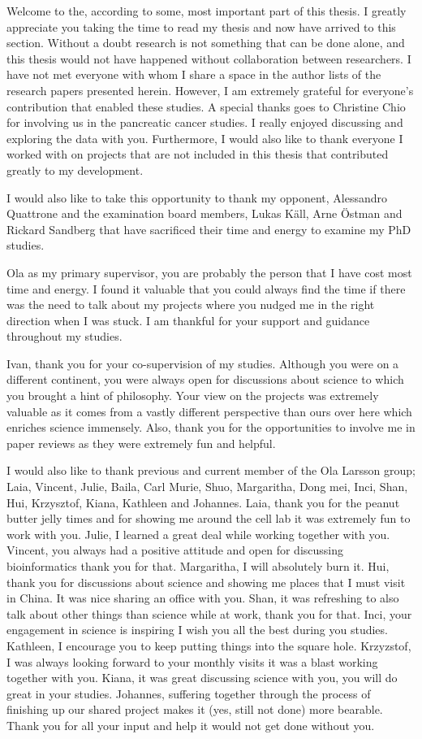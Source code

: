 \documentclass[12pt,openany]{book}
\begin{document}
Welcome to the, according to some, most important part of this thesis. I
greatly appreciate you taking the time to read my thesis and now have
arrived to this section. Without a doubt research is not something that
can be done alone, and this thesis would not have happened without
collaboration between researchers. I have not met everyone with whom I
share a space in the author lists of the research papers presented
herein. However, I am extremely grateful for everyone's contribution
that enabled these studies. A special thanks goes to Christine Chio for
involving us in the pancreatic cancer studies. I really enjoyed
discussing and exploring the data with you. Furthermore, I would also
like to thank everyone I worked with on projects that are not included
in this thesis that contributed greatly to my development.

I would also like to take this opportunity to thank my opponent,
Alessandro Quattrone and the examination board members, Lukas Käll, Arne
Östman and Rickard Sandberg that have sacrificed their time and energy
to examine my PhD studies.

Ola as my primary supervisor, you are probably the person that I have
cost most time and energy. I found it valuable that you could always
find the time if there was the need to talk about my projects where you
nudged me in the right direction when I was stuck. I am thankful for
your support and guidance throughout my studies.

Ivan, thank you for your co-supervision of my studies. Although you were
on a different continent, you were always open for discussions about
science to which you brought a hint of philosophy. Your view on the
projects was extremely valuable as it comes from a vastly different
perspective than ours over here which enriches science immensely. Also,
thank you for the opportunities to involve me in paper reviews as they
were extremely fun and helpful.

I would also like to thank previous and current member of the Ola
Larsson group; Laia, Vincent, Julie, Baila, Carl Murie, Shuo,
Margaritha, Dong mei, Inci, Shan, Hui, Krzysztof, Kiana, Kathleen and
Johannes. Laia, thank you for the peanut butter jelly times and for
showing me around the cell lab it was extremely fun to work with you.
Julie, I learned a great deal while working together with you. Vincent,
you always had a positive attitude and open for discussing
bioinformatics thank you for that. Margaritha, I will absolutely burn
it. Hui, thank you for discussions about science and showing me places
that I must visit in China. It was nice sharing an office with you.
Shan, it was refreshing to also talk about other things than science
while at work, thank you for that. Inci, your engagement in science is
inspiring I wish you all the best during you studies. Kathleen, I
encourage you to keep putting things into the square hole. Krzyzstof, I
was always looking forward to your monthly visits it was a blast working
together with you. Kiana, it was great discussing science with you, you
will do great in your studies. Johannes, suffering together through the
process of finishing up our shared project makes it (yes, still not
done) more bearable. Thank you for all your input and help it would not
get done without you.
\end{document}
